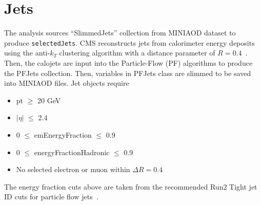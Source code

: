 \section{Jets}\label{sec:jets}
The analysis sources ``SlimmedJets'' collection from MINIAOD dataset to produce {\tt selectedJets}.
CMS reconstructs jets from calorimeter energy deposits using the
anti-$k_T$ clustering algorithm with a distance parameter of $R=0.4$~\cite{Cacciari:2008gp}.
Then, the calojets are input into the Particle-Flow (PF) algorithms to produce the PFJets collection. Then, variables in PFJets class are slimmed to be saved into MINIAOD files.
Jet objects require
\begin{itemize}
  \item pt $\geq$ 20 GeV
  \item $|\eta|$ $\leq$ 2.4
  \item 0 $\leq$ emEnergyFraction $\leq$ 0.9
  \item 0 $\leq$ energyFractionHadronic $\leq$ 0.9
  \item No selected electron or muon within $\Delta R=0.4$
\end{itemize}
The energy fraction cuts above are taken from the recommended Run2 Tight jet ID
cuts for particle flow jets~\cite{jetid_2018}.
